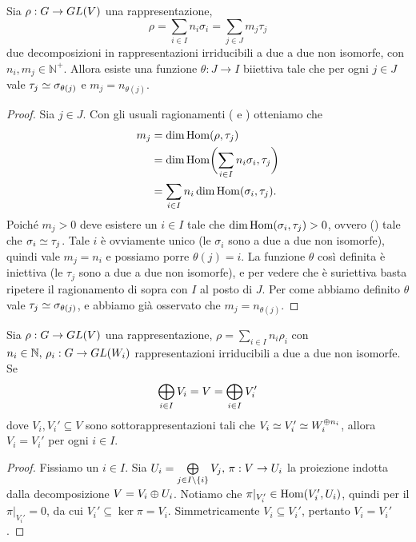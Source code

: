 \begin{proposition}
Sia $\rho:G\to GL(V)$ una rappresentazione,
$$
\rho=\sum_{i\in I}n_i\sigma_i=\sum_{j\in J}m_j\tau_j
$$
due decomposizioni in rappresentazioni irriducibili a due a due non isomorfe, con $n_i\comma m_j\in\mathbb{N}^+$. Allora esiste una funzione $\theta:J\to I$ biiettiva tale che per ogni $j\in J$ vale $\tau_j\simeq\sigma_{\theta(j)}$ e $m_j=n_{\theta(j)}$.
\end{proposition}
\begin{proof}
Sia $j\in J$. Con gli usuali ragionamenti ( e ) otteniamo che
\begin{align*}
m_j&=\dim\operatorname{Hom}(\rho,\tau_j)\\
&=\dim\operatorname{Hom}\biggl(\sum_{i\in I}n_i\sigma_i,\tau_j\biggr)\\
&=\sum_{i\in I}n_i\dim\operatorname{Hom}(\sigma_i,\tau_j).
\end{align*}
Poiché $m_j>0$ deve esistere un $i\in I$ tale che $\dim\operatorname{Hom}(\sigma_i,\tau_j)>0$, ovvero () tale che $\sigma_i\simeq\tau_j$. Tale $i$ è ovviamente unico (le $\sigma_i$ sono a due a due non isomorfe), quindi vale $m_j=n_i$ e possiamo porre $\theta(j)=i$. La funzione $\theta$ così definita è iniettiva (le $\tau_j$ sono a due a due non isomorfe), e per vedere che è suriettiva basta ripetere il ragionamento di sopra con $I$ al posto di $J$. Per come abbiamo definito $\theta$ vale $\tau_j\simeq\sigma_{\theta(j)}$, e abbiamo già osservato che $m_j=n_{\theta(j)}$.
\end{proof}

\begin{proposition}
Sia $\rho:G\to GL(V)$ una rappresentazione, $\rho=\sum_{i\in I}n_i\rho_i$ con $n_i\in\mathbb{N},\,\allowbreak\rho_i:G\to GL(W_i)$ rappresentazioni irriducibili a due a due non isomorfe. Se
$$
\bigoplus_{i\in I}V_i=V=\bigoplus_{i\in I}V_i'
$$
dove $V_i\comma V_i'\subseteq V$ sono sottorappresentazioni tali che $V_i\simeq V_i'\simeq W_i^{\oplus n_i}$, allora $V_i=V_i'$ per ogni $i\in I$.
\end{proposition}
\begin{proof}
Fissiamo un $i\in I$. Sia $U_i=\bigoplus\limits_{j\in I\setminus\{i\}}V_j,\,\allowbreak\pi:V\to U_i$ la proiezione indotta dalla decomposizione $V=V_i\oplus U_i$. Notiamo che $\pi|_{V_i'}\in\operatorname{Hom}(V_i',U_i)$, quindi per il  $\pi|_{V_i'}=0$, da cui $V_i'\subseteq\ker\pi=V_i$. Simmetricamente $V_i\subseteq V_i'$, pertanto $V_i=V_i'$.
\end{proof}

